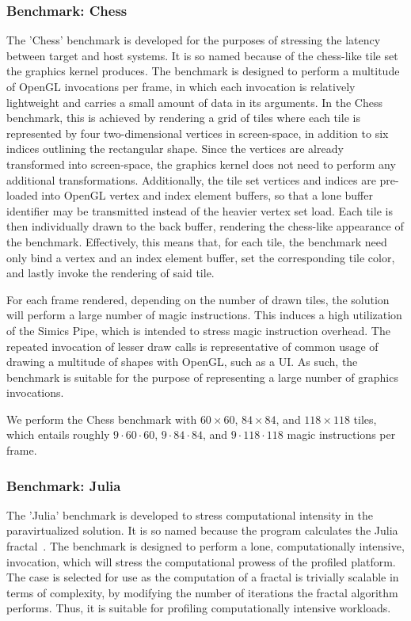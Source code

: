 \subsubsection{Benchmark: Chess}
\label{par:experimentalmethodology_benchmarking_benchmarkchess}
The 'Chess' benchmark is developed for the purposes of stressing the latency between target and host systems.
It is so named because of the chess-like tile set the graphics kernel produces.
The benchmark is designed to perform a multitude of OpenGL invocations per frame, in which each invocation is relatively lightweight and carries a small amount of data in its arguments.
In the Chess benchmark, this is achieved by rendering a grid of tiles where each tile is represented by four two-dimensional vertices in screen-space, in addition to six indices outlining the rectangular shape.
Since the vertices are already transformed into screen-space, the graphics kernel does not need to perform any additional transformations.
Additionally, the tile set vertices and indices are pre-loaded into OpenGL vertex and index element buffers, so that a lone buffer identifier may be transmitted instead of the heavier vertex set load.
Each tile is then individually drawn to the back buffer, rendering the chess-like appearance of the benchmark.
Effectively, this means that, for each tile, the benchmark need only bind a vertex and an index element buffer, set the corresponding tile color, and lastly invoke the rendering of said tile.

For each frame rendered, depending on the number of drawn tiles, the solution will perform a large number of magic instructions.
This induces a high utilization of the Simics Pipe, which is intended to stress magic instruction overhead.
The repeated invocation of lesser draw calls is representative of common usage of drawing a multitude of shapes with OpenGL, such as a UI.
As such, the benchmark is suitable for the purpose of representing a large number of graphics invocations.

We perform the Chess benchmark with $60\times60$, $84\times84$, and $118\times118$ tiles, which entails roughly $9\cdot60\cdot60$, $9\cdot84\cdot84$, and $9\cdot118\cdot118$ magic instructions per frame.

\subsubsection{Benchmark: Julia}
\label{par:experimentalmethodology_benchmarking_benchmarkjulia}
The 'Julia' benchmark is developed to stress computational intensity in the paravirtualized solution.
It is so named because the program calculates the Julia fractal~.
The benchmark is designed to perform a lone, computationally intensive, invocation, which will stress the computational prowess of the profiled platform.
The case is selected for use as the computation of a fractal is trivially scalable in terms of complexity, by modifying the number of iterations the fractal algorithm performs.
Thus, it is suitable for profiling computationally intensive workloads.

